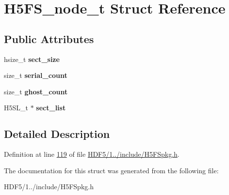 \hypertarget{struct_h5_f_s__node__t}{}\section{H5\+F\+S\+\_\+node\+\_\+t Struct Reference}
\label{struct_h5_f_s__node__t}
\subsection*{Public Attributes}
\begin{DoxyCompactItemize}
\item 
\mbox{\label{struct_h5_f_s__node__t_a2946e4c25276ed779978b5ec18cb3f30}} 
hsize\+\_\+t {\bfseries sect\+\_\+size}
\item 
\mbox{\label{struct_h5_f_s__node__t_a52a4e95f055e77d306c936f755fa7f67}} 
size\+\_\+t {\bfseries serial\+\_\+count}
\item 
\mbox{\label{struct_h5_f_s__node__t_a934788879e9ef02a54a19fe4a7f49a64}} 
size\+\_\+t {\bfseries ghost\+\_\+count}
\item 
\mbox{\label{struct_h5_f_s__node__t_a57631cc59ca490646dcfb8b651808a3d}} 
H5\+S\+L\+\_\+t $\ast$ {\bfseries sect\+\_\+list}
\end{DoxyCompactItemize}


\subsection{Detailed Description}


Definition at line \hyperlink{_h_d_f5_21_810_81_2include_2_h5_f_spkg_8h_source_l00119}{119} of file \hyperlink{_h_d_f5_21_810_81_2include_2_h5_f_spkg_8h_source}{H\+D\+F5/1../include/\+H5\+F\+Spkg.\+h}.



The documentation for this struct was generated from the following file\+:\begin{DoxyCompactItemize}
\item 
H\+D\+F5/1../include/\+H5\+F\+Spkg.\+h\end{DoxyCompactItemize}
